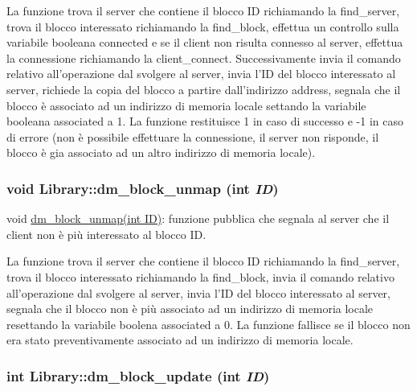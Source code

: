 La funzione trova il server che contiene il blocco ID richiamando la find\_\-server, trova il blocco interessato richiamando la find\_\-block, effettua un controllo sulla variabile booleana connected e se il client non risulta connesso al server, effettua la connessione richiamando la client\_\-connect. Successivamente invia il comando relativo all'operazione dal svolgere al server, invia l'ID del blocco interessato al server, richiede la copia del blocco a partire dall'indirizzo address, segnala che il blocco è associato ad un indirizzo di memoria locale settando la variabile booleana associated a 1. La funzione restituisce 1 in caso di successo e -1 in caso di errore (non è possibile effettuare la connessione, il server non risponde, il blocco è gia associato ad un altro indirizzo di memoria locale). \hypertarget{classLibrary_f9cacba594b2d8ad1f01d73755ef79aa_f9cacba594b2d8ad1f01d73755ef79aa}{
\subsubsection[{dm\_\-block\_\-unmap}]{\setlength{\rightskip}{0pt plus 5cm}void Library::dm\_\-block\_\-unmap (int {\em ID})}}
\label{classLibrary_f9cacba594b2d8ad1f01d73755ef79aa_f9cacba594b2d8ad1f01d73755ef79aa}


void \hyperlink{classLibrary_f9cacba594b2d8ad1f01d73755ef79aa_f9cacba594b2d8ad1f01d73755ef79aa}{dm\_\-block\_\-unmap(int ID)}: funzione pubblica che segnala al server che il client non è più interessato al blocco ID. 

La funzione trova il server che contiene il blocco ID richiamando la find\_\-server, trova il blocco interessato richiamando la find\_\-block, invia il comando relativo all'operazione dal svolgere al server, invia l'ID del blocco interessato al server, segnala che il blocco non è più associato ad un indirizzo di memoria locale resettando la variabile boolena associated a 0. La funzione fallisce se il blocco non era stato preventivamente associato ad un indirizzo di memoria locale. \hypertarget{classLibrary_1f541c7e1158ffb4d6d0f976dba29d71_1f541c7e1158ffb4d6d0f976dba29d71}{
\subsubsection[{dm\_\-block\_\-update}]{\setlength{\rightskip}{0pt plus 5cm}int Library::dm\_\-block\_\-update (int {\em ID})}}
\label{classLibrary_1f541c7e1158ffb4d6d0f976dba29d71_1f541c7e1158ffb4d6d0f976dba29d71}


